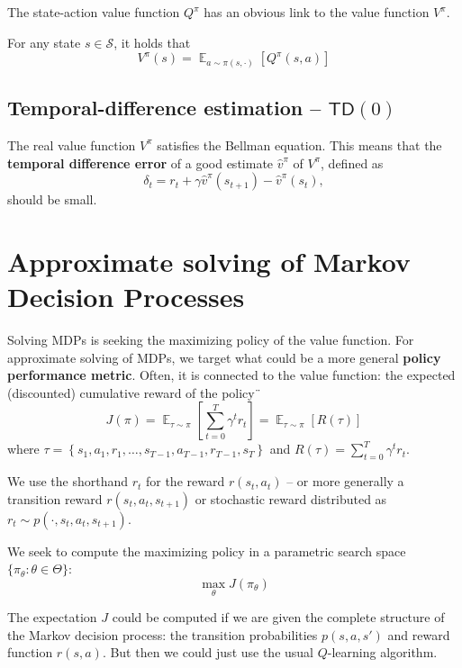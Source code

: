 \documentclass[12pt]{report}
\DeclareMathOperator{\EE}{\mathbb{E}}
\newcommand{\calS}{\mathcal{S}}
\newcommand{\bluefont}{\color{Blue}}
\begin{document}
The state-action value function $Q^\pi$ has an obvious link to the value function $V^\pi$.

\begin{prop}
	For any state $s\in\calS$, it holds that
	\begin{equation}
	V^\pi(s) = \EE_{a\sim \pi(s,\cdot)}\left[
	Q^\pi(s, a)
	\right]
	\end{equation}
\end{prop}



\section{Temporal-difference estimation -- $\mathsf{TD}(0)$}

The real value function $V^\pi$ satisfies the Bellman equation. This means that the \textbf{\bluefont temporal difference error} of a good estimate $\hat{v}^\pi$ of $V^\pi$, defined as
\[
	\delta_t = r_t + \gamma \hat{v}^\pi(s_{t+1}) - \hat{v}^\pi(s_t),
\]
should be small.






\chapter{Approximate solving of Markov Decision Processes}


Solving MDPs is seeking the maximizing policy of the value function. For approximate solving of MDPs, we target what could be a more general \textbf{\bluefont policy performance metric}. Often, it is connected to the value function: the expected (discounted) cumulative reward of the policy¨
\begin{equation}\label{eq:PolicyPerfCumReward}
J(\pi) = \EE_{\tau\sim\pi}\left[
	\sum_{t=0}^{T} \gamma^t r_t
\right] =
	\EE_{\tau\sim\pi}
	\left[R(\tau)\right]
\end{equation}
where $\tau = \left\{ s_1,a_1,r_1,\ldots,s_{T-1},a_{T-1},r_{T-1},s_{T}\right\}$ and $R(\tau) = \sum_{t=0}^T \gamma^t r_t$.

We use the shorthand $r_t$ for the reward $r(s_t, a_t)$ -- or more generally a transition reward $r(s_t, a_t, s_{t+1})$ or stochastic reward distributed as $r_t \sim p(\cdot, s_t, a_t, s_{t+1})$.

We seek to compute the maximizing policy in a parametric search space $\{\pi_\theta: \theta\in\Theta\}$:
\[
	\max_\theta J(\pi_\theta)
\]

The expectation $J$ could be computed if we are given the complete structure of the Markov decision process: the transition probabilities $p(s,a,s')$ and reward function $r(s,a)$. But then we could just use the usual $Q$-learning algorithm.
\end{document}
